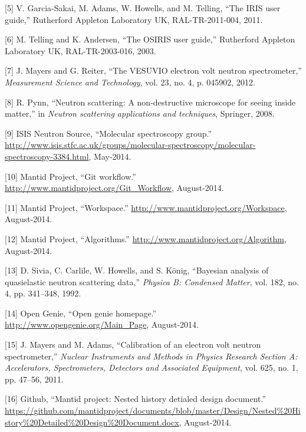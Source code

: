 \documentclass[paper=a4, fontsize=11pt]{scrartcl}	%
\numberwithin{equation}{section}															%
\numberwithin{figure}{section}																%
\numberwithin{table}{section}
\begin{document}
{[}5{]} V. Garcia-Sakai, M. Adams, W. Howells, and M. Telling, ``The
IRIS user guide,'' Rutherford Appleton Laboratory UK, RAL-TR-2011-004,
2011.

{[}6{]} M. Telling and K. Andersen, ``The OSIRIS user guide,''
Rutherford Appleton Laboratory UK, RAL-TR-2003-016, 2003.

{[}7{]} J. Mayers and G. Reiter, ``The VESUVIO electron volt neutron
spectrometer,'' \emph{Measurement Science and Technology}, vol. 23, no.
4, p. 045902, 2012.

{[}8{]} R. Pynn, ``Neutron scattering: A non-destructive microscope for
seeing inside matter,'' in \emph{Neutron scattering applications and
techniques}, Springer, 2008.

{[}9{]} ISIS Neutron Source, ``Molecular spectroscopy group.''
\url{http://www.isis.stfc.ac.uk/groups/molecular-spectroscopy/molecular-spectroscopy-3384.html},
May-2014.

{[}10{]} Mantid Project, ``Git workflow.''
\url{http://www.mantidproject.org/Git_Workflow}, August-2014.

{[}11{]} Mantid Project, ``Workspace.''
\url{http://www.mantidproject.org/Workspace}, August-2014.

{[}12{]} Mantid Project, ``Algorithms.''
\url{http://www.mantidproject.org/Algorithm}, August-2014.

{[}13{]} D. Sivia, C. Carlile, W. Howells, and S. K{ö}nig, ``Bayesian
analysis of quasielastic neutron scattering data,'' \emph{Physica B:
Condensed Matter}, vol. 182, no. 4, pp. 341--348, 1992.

{[}14{]} Open Genie, ``Open genie homepage.''
\url{http://www.opengenie.org/Main_Page}, August-2014.

{[}15{]} J. Mayers and M. Adams, ``Calibration of an electron volt
neutron spectrometer,'' \emph{Nuclear Instruments and Methods in Physics
Research Section A: Accelerators, Spectrometers, Detectors and
Associated Equipment}, vol. 625, no. 1, pp. 47--56, 2011.

{[}16{]} Github, ``Mantid project: Nested history detialed design
document.''
\url{https://github.com/mantidproject/documents/blob/master/Design/Nested\%20History\%20Detailed\%20Design\%20Document.docx},
August-2014.
\end{document}
